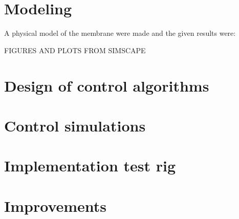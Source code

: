 \section{Modeling}
A physical model of the membrane were made and the given results were:


FIGURES AND PLOTS FROM SIMSCAPE

\section{Design of control algorithms}

\section{Control simulations}

\section{Implementation test rig}

\section{Improvements}
